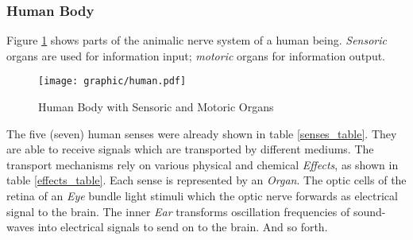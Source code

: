 %
%
%
%
%
%
%

\subsubsection{Human Body}
\label{human_body_heading}

Figure \ref{human_figure} shows parts of the animalic nerve system of a human
being. \emph{Sensoric} organs are used for information input; \emph{motoric}
organs for information output.

\begin{figure}[ht]
    \begin{center}
        \texttt{[image: graphic/human.pdf]}
        \caption{Human Body with Sensoric and Motoric Organs}
        \label{human_figure}
    \end{center}
\end{figure}

The five (seven) human senses were already shown in table \ref{senses_table}.
They are able to receive signals which are transported by different mediums.
The transport mechanisms rely on various physical and chemical \emph{Effects},
as shown in table \ref{effects_table}. Each sense is represented by an
\emph{Organ}. The optic cells of the retina of an \emph{Eye} bundle light
stimuli which the optic nerve forwards as electrical signal to the brain. The
inner \emph{Ear} transforms oscillation frequencies of sound-waves into
electrical signals to send on to the brain. And so forth.

